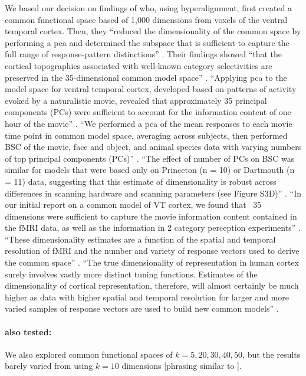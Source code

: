 %
We based our decision on findings of \citep{haxby2011common} who, using
hyperalignment, first created a common functional space based of 1,000
dimensions from voxels of the ventral temporal cortex.
%
Then, they ``reduced the dimensionality of the common space by performing a
\ac{pca} and determined the subspace that is sufficient to capture the full
range of response-pattern distinctions'' \citep{haxby2011common}.
%
Their findings showed ``that the cortical topographies associated with
well-known category selectivities are preserved in the 35-dimensional common
model space'' \citep{haxby2011common}.
%
``Applying \ac{pca} to the model space for ventral temporal cortex, developed
based on patterns of activity evoked by a naturalistic movie, revealed that
approximately 35 principal components (PCs) were sufficient to account for the
information content of one hour of the movie'' \citep{haxby2011common}.
%
``We performed a \ac{pca} of the mean responses to each movie time point in
common model space, averaging across subjects, then performed BSC of the movie,
face and object, and animal species data with varying numbers of top principal
components (PCs)'' \citep{haxby2011common}.
%
``The effect of number of PCs on BSC was similar for models that were based only
on Princeton (n = 10) or Dartmouth (n = 11) data, suggesting that this estimate
of dimensionality is robust across differences in scanning hardware and scanning
parameters (see Figure S3D)'' \citep{haxby2011common}.
%
``In our initial report on a common model of VT cortex, we found that ~35
dimensions were sufficient to capture the movie information content contained in
the fMRI data, as well as the information in 2 category perception experiments''
\citep{guntupalli2016model}.
%
``These dimensionality estimates are a function of the spatial and temporal
resolution of fMRI and the number and variety of response vectors used to derive
the common space'' \citep{guntupalli2016model}.
%
``The true dimensionality of representation in human cortex surely involves
vastly more distinct tuning functions. Estimates of the dimensionality of
cortical representation, therefore, will almost certainly be much higher as data
with higher spatial and temporal resolution for larger and more varied samples
of response vectors are used to build new common models''
\citep{guntupalli2016model}.

\paragraph{also tested:}
%
We also explored common functional spaces of $k=5,20,30,40,50$, but the results
barely varied from using $k=10$ dimensions [phrasing similar to
\citep{vodrahalli2018mapping}].


